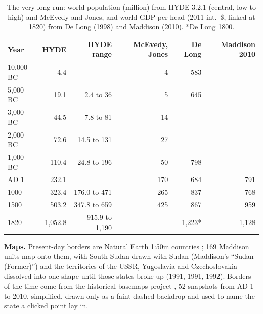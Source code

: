 \documentclass[11pt,a4paper]{article}
\begin{document}
\begin{table}[tbp]\centering\small\caption{The very long run: world population (million) from HYDE 3.2.1 (central, low to high) and McEvedy and Jones, and world GDP per head (2011 int.\ \$, linked at 1820) from De Long (1998) and Maddison (2010). *De Long 1800.}\label{tab:lr}\begin{tabular}{lrrrrr}\toprule Year & HYDE & HYDE range & McEvedy, Jones & De Long & Maddison 2010\\\midrule
10,000 BC & 4.4 &  & 4 & 583 & \\
5,000 BC & 19.1 & 2.4 to 36 & 5 & 645 & \\
3,000 BC & 44.5 & 7.8 to 81 & 14 &  & \\
2,000 BC & 72.6 & 14.5 to 131 & 27 &  & \\
1,000 BC & 110.4 & 24.8 to 196 & 50 & 798 & \\
AD 1 & 232.1 &  & 170 & 684 & 791\\
1000 & 323.4 & 176.0 to 471 & 265 & 837 & 768\\
1500 & 503.2 & 347.8 to 659 & 425 & 867 & 959\\
1820 & 1,052.8 & 915.9 to 1,190 &  & 1,223* & 1,128\\
\bottomrule\end{tabular}\end{table}

\textbf{Maps.} Present-day borders are Natural Earth 1:50m countries \citep{naturalearth}; 169 Maddison units map onto them, with South Sudan drawn with Sudan (Maddison's ``Sudan (Former)'') and the territories of the USSR, Yugoslavia and Czechoslovakia dissolved into one shape until those states broke up (1991, 1991, 1992). Borders of the time come from the historical-basemaps project \citep{ourednik}, 52 snapshots from AD 1 to 2010, simplified, drawn only as a faint dashed backdrop and used to name the state a clicked point lay in.
\end{document}
